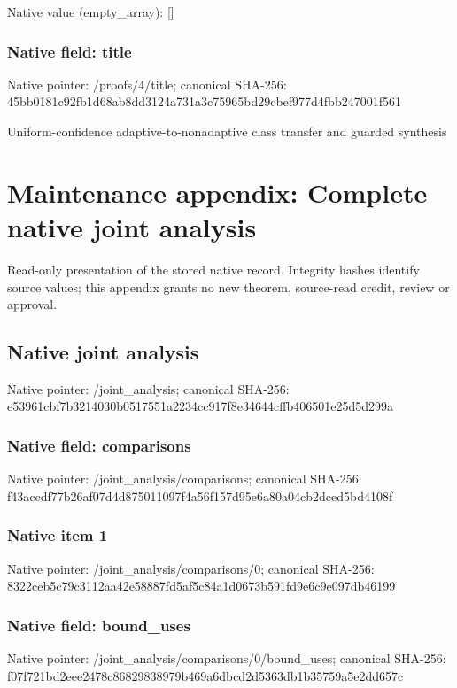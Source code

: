 \documentclass[10pt,a4paper]{article}
\begin{document}
Native value (empty\_\allowbreak{}array): []

\subsubsection{Native field: title}
Native pointer: /proofs/4/title; canonical SHA-256: 45bb0181c92fb1d68ab8dd3124a731a3c75965bd29cbef977d4fbb247001f561

\begingroup\raggedright\sloppy Uniform-confidence adaptive-to-nonadaptive class transfer and guarded synthesis\par\endgroup

\section{Maintenance appendix: Complete native joint analysis}
Read-only presentation of the stored native record. Integrity hashes identify source values; this appendix grants no new theorem, source-read credit, review or approval.

\subsection{Native joint analysis}
Native pointer: /joint\_\allowbreak{}analysis; canonical SHA-256: e53961cbf7b3214030b0517551a2234cc917f8e34644cffb406501e25d5d299a

\subsubsection{Native field: comparisons}
Native pointer: /joint\_\allowbreak{}analysis/comparisons; canonical SHA-256: f43accdf77b26af07d4d875011097f4a56f157d95e6a80a04cb2dced5bd4108f

\subsubsection{Native item 1}
Native pointer: /joint\_\allowbreak{}analysis/comparisons/0; canonical SHA-256: 8322ceb5c79c3112aa42e58887fd5af5c84a1d0673b591fd9e6c9e097db46199

\subsubsection{Native field: bound\_\allowbreak{}uses}
Native pointer: /joint\_\allowbreak{}analysis/comparisons/0/bound\_\allowbreak{}uses; canonical SHA-256: f07f721bd2eee2478c86829838979b469a6dbcd2d5363db1b35759a5e2dd657c
\end{document}
